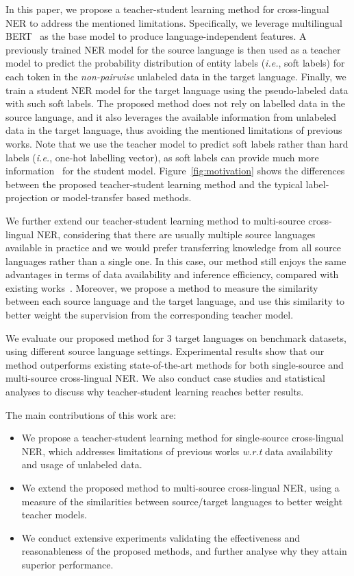 \documentclass[11pt,a4paper]{article}
\newcommand\ie{\textit{i.e.}}
\newcommand\wrt{\textit{w.r.t}}
\begin{document}
	In this paper, we propose a teacher-student learning method for cross-lingual NER to address the mentioned limitations. 
	Specifically, we leverage multilingual BERT~\cite{devlin2019bert} as the base model to produce language-independent features. A previously trained NER model for the source language is then used as a teacher model to predict the probability distribution of entity labels (\ie, soft labels) for each token in the \textit{non-pairwise} unlabeled data in the target language. Finally, we train a student NER model for the target language using the pseudo-labeled data with such soft labels.   
	The proposed method does not rely on labelled data in the source language, and it also leverages the available information from unlabeled data in the target language, thus avoiding the mentioned limitations of previous works. Note that we use the teacher model to predict soft labels rather than hard labels (\ie, one-hot labelling vector), as soft labels can provide much more information~\cite{hinton2015distilling} for the student model. Figure~\ref{fig:motivation} shows the differences between the proposed teacher-student learning method and the typical label-projection or model-transfer based methods. 


	We further extend our teacher-student learning method to multi-source cross-lingual NER, considering that there are usually multiple source languages available in practice and we would prefer transferring knowledge from all source languages rather than a single one. 
	In this case, our method still enjoys the same advantages in terms of data availability and inference efficiency, compared with existing works~\cite{tackstrom2012nudging,chen2019multi,enghoff2018low, rahimi2019massively}. 
	Moreover, we propose a method to measure the similarity between each source language and the target language, and use this similarity to better weight the supervision from the corresponding teacher model. 

	We evaluate our proposed method for 3 target languages on benchmark datasets, using different source language settings. Experimental results show that our method outperforms existing state-of-the-art methods for both single-source and multi-source cross-lingual NER. We also conduct case studies and statistical analyses to discuss why teacher-student learning reaches better results.
	
	The main contributions of this work are:
	\begin{itemize}
		\item We propose a teacher-student learning method for single-source cross-lingual NER, which addresses limitations of previous works \wrt{} data availability and usage of unlabeled data.
		\item We extend the proposed method to multi-source cross-lingual NER, using a measure of the similarities between source/target languages to better weight teacher models.
		\item We conduct extensive experiments validating the effectiveness and reasonableness of the proposed methods, and further analyse why they attain superior performance. 
	\end{itemize}
	
\end{document}
